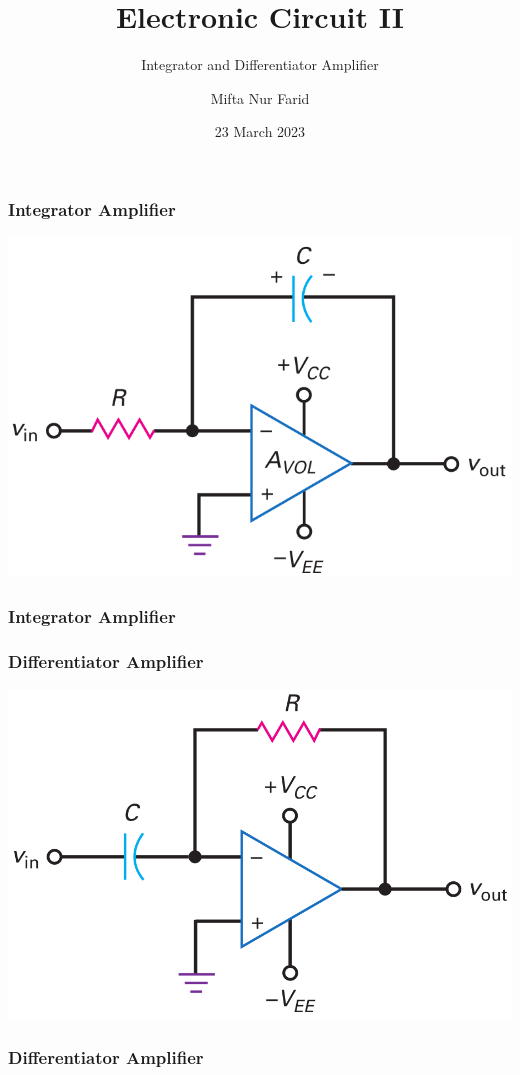 \documentclass[pdflatex,compress]{beamer}
\title{Electronic Circuit II}
\subtitle{Integrator and Differentiator Amplifier}
\author{Mifta Nur Farid}
\date{23 March 2023}
\begin{document}
\maketitle

\begin{frame}
	\frametitle{Integrator Amplifier}
	\begin{center}
		\includegraphics[width=0.9\linewidth]{img/Figure-20-24}
	\end{center}
\end{frame}

\begin{frame}
	\frametitle{Integrator Amplifier}

\end{frame}

\begin{frame}
	\frametitle{Differentiator Amplifier}
	\begin{center}
		\includegraphics[width=0.9\linewidth]{img/Figure-20-41}
	\end{center}
\end{frame}

\begin{frame}
	\frametitle{Differentiator Amplifier}

\end{frame}
\end{document}
